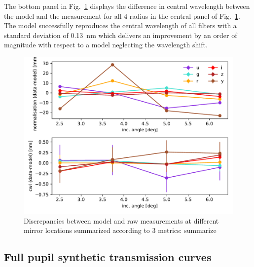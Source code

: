 The bottom panel in Fig.~\ref{fig:metrics} displays the difference in
central wavelength between the model and the measurement for all 4
radius in the central panel of Fig.~\ref{fig:metrics}. The model
successfully reproduces the central wavelength of all filters with a
standard deviation of \SI{0.13}{nm} which delivers an improvement by
an order of magnitude with respect to a model neglecting the
wavelength shift. 

\begin{figure}
  \centering
  \includegraphics[width=1\linewidth]{fig/metrics.pdf}
  \caption{Discrepancies between model and raw measurements at different mirror locations summarized according to 3 metrics: summarize}
  \label{fig:metrics}
\end{figure}

\subsection{Full pupil synthetic transmission curves}

